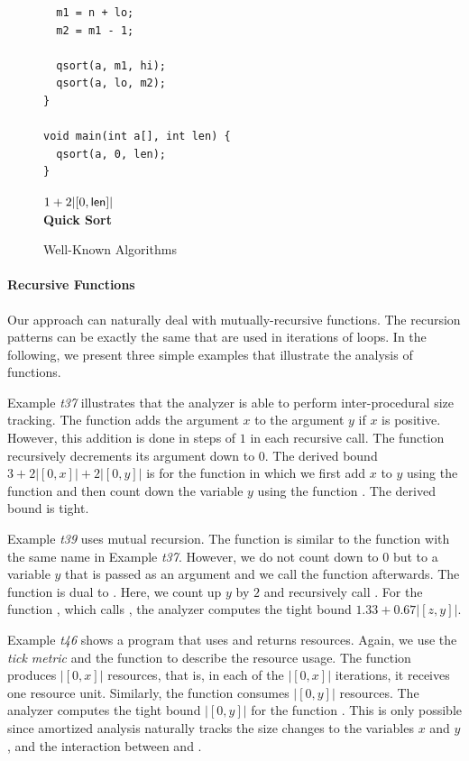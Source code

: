 \documentclass[nocopyrightspace,preprint,pldi]{sigplanconf-pldi15}
\begin{document}
{\begin{figure}
\begin{minipage}[b]{\progwidth}
\begin{center}
\begin{lstlisting}
  m1 = n + lo;
  m2 = m1 - 1;

  qsort(a, m1, hi);
  qsort(a, lo, m2);
}

void main(int a[], int len) {
  qsort(a, 0, len);
}
   \end{lstlisting}

$1 + 2 |[0,\mathsf{len}]|$
\\[.7\baselineskip]
      {\bf Quick Sort}
    \end{center}
  \end{minipage}

   \caption{Well-Known Algorithms}
  \label{fig:cat3}
\end{figure}





\paragraph{Recursive Functions}

Our approach can naturally deal with mutually-recursive functions.
The recursion patterns can be exactly the same that are used in
iterations of loops.  In the following, we present three simple
examples that illustrate the analysis of functions.

Example \emph{t37} illustrates that the analyzer is able to perform
inter-procedural size tracking.  The function  adds the
argument $x$ to the argument $y$ if $x$ is positive.  However, this
addition is done in steps of $1$ in each recursive call.  The function
 recursively decrements its argument down to $0$.
The derived bound $3 + 2|[0, x]| +2|[0, y]|$ is for the function
 in which we first add $x$ to $y$ using the function
 and then count down the variable $y$ using the function
.  The derived bound is tight.

Example \emph{t39} uses mutual recursion.  The function
 is similar to the function with the same name in
Example \emph{t37}.  However, we do not count down to $0$ but to a
variable $y$ that is passed as an argument and we call the function
 afterwards.  The function  is dual to
.  Here, we count up $y$ by $2$ and recursively call
.  For the function , which calls
, the analyzer computes the tight bound $1.33 +
0.67 |[z,y]|$.

Example \emph{t46} shows a program that uses and returns resources.
Again, we use the \emph{tick metric} and the function  to
describe the resource usage.  The function  produces
$|[0,x]|$ resources, that is, in each of the $|[0,x]|$ iterations, it
receives one resource unit.  Similarly, the function 
consumes $|[0,y]|$ resources.  The analyzer computes the tight bound
$|[0,y]|$ for the function .  This is only possible since
amortized analysis naturally tracks the size changes to the variables
$x$ and $y$, and the interaction between  and
.


}
\end{document}
